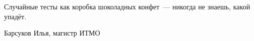 





\epigraph{Случайные тесты как коробка шоколадных конфет~--- никогда не знаешь, какой упадёт.}{Барсуков Илья, магистр ИТМО}
